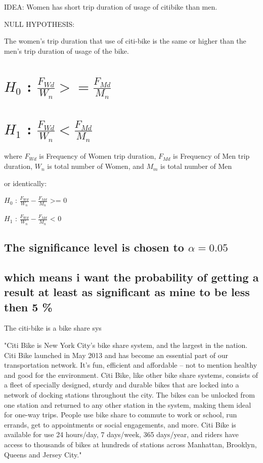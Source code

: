 IDEA:
Women has short trip duration of usage of citibike than men.

NULL HYPOTHESIS:

The women's trip duration that use of citi-bike is the same or higher than the men's trip duration of usage of the bike.

\section{$H_0$ : $\frac{F_{Wd}}{W_{n}} >= \frac{F_{Md}}{M_{n}} $ }



\section{$H_1$ : $\frac{F_{Wd}}{W_{n}} < \frac{F_{Md}}{M_{n}} $}

where $F_{Wd}$ is Frequency of Women trip duration, $F_{Md}$ is Frequency of Men trip duration, ${W_{n}}$ is total number of Women, and ${M_{m}}$ is total number of Men

or identically:

$H_0$ : $\frac{F_{Wd}}{W_{n}} - \frac{F_{Md}}{M_{n}} $ >= 0

$H_1$ : $\frac{F_{Wd}}{W_{n}} - \frac{F_{Md}}{M_{n}} $ < 0

\subsection{The significance level is chosen to $\alpha=0.05$}

\subsection{which means i want the probability of getting a result at least as significant as mine to be less then 5 \%}


The citi-bike is a bike share sys

"Citi Bike is New York City’s bike share system, and the largest in the nation. Citi Bike launched in May 2013 and has become an essential part of our transportation network. It's fun, efficient and affordable – not to mention healthy and good for the environment.
Citi Bike, like other bike share systems, consists of a fleet of specially designed, sturdy and durable bikes that are locked into a network of docking stations throughout the city. The bikes can be unlocked from one station and returned to any other station in the system, making them ideal for one-way trips. People use bike share to commute to work or school, run errands, get to appointments or social engagements, and more.
Citi Bike is available for use 24 hours/day, 7 days/week, 365 days/year, and riders have access to thousands of bikes at hundreds of stations across Manhattan, Brooklyn, Queens and Jersey City." 